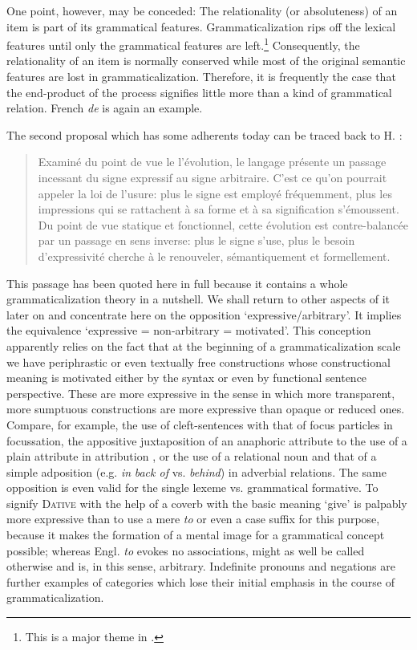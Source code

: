 One point, however, may be conceded: The relationality (or absoluteness) of an item is part of its grammatical features. Grammaticalization rips off the lexical features until only the grammatical features are left.\footnote{This is a major theme in \citet{Givón1973}.} Consequently, the relationality of an item is normally conserved while most of the original semantic features are lost in grammaticalization. Therefore, it is frequently the case that the end-product of the process signifies little more than a kind of grammatical relation. French \textit{de} is again an example.

The second proposal which has some adherents today can be traced back to H. \citet[233]{Frei1929}:

\begin{quote}
Examiné du point de vue le l'évolution, le langage présente un passage incessant du signe expressif au signe arbitraire. C'est ce qu'on pourrait appeler la loi de l'usure: plus le signe est employé fréquemment, plus les impressions qui se rattachent à sa forme et à sa signification s'émoussent. Du point de vue statique et fonctionnel, cette évolution est contre-balancée par un passage en sens inverse: plus le signe s'use, plus le besoin d'expressivité cherche à le renouveler, sémantiquement et formellement.
\end{quote}

This passage has been quoted here in full because it contains a whole grammaticalization theory in a nutshell. We shall return to other aspects of it later on and concentrate here on the opposition ‘expressive/arbitrary’. It implies the equivalence ‘expressive = non-arbitrary = motivated’. This conception apparently relies on the fact that at the beginning of a grammaticalization scale we have periphrastic or even textually free constructions whose constructional meaning is motivated either by the syntax or even by functional sentence perspective. These are more expressive in the sense in which more transparent, more sumptuous constructions are more expressive than opaque or reduced ones. Compare, for example, the use of cleft-sentences with that of focus particles in focussation, the appositive juxtaposition of an anaphoric attribute to the use of a plain attribute in attribution%
, or the use of a relational noun and that of a simple adposition (e.g. \textit{in} \textit{back of} vs. \textit{behind}) in adverbial relations. The same opposition is even valid for the single lexeme vs. grammatical formative. To signify \textsc{Dative} with the help of a coverb with the basic meaning ‘give’ is palpably more expressive than to use a mere \textit{to} or even a case suffix for this purpose, because it makes the formation of a mental image for a grammatical concept possible; whereas Engl. \textit{to} evokes no associations, might as well be called otherwise and is, in this sense, arbitrary. Indefinite pronouns and negations are further examples of categories which lose their initial emphasis in the course of grammaticalization.

